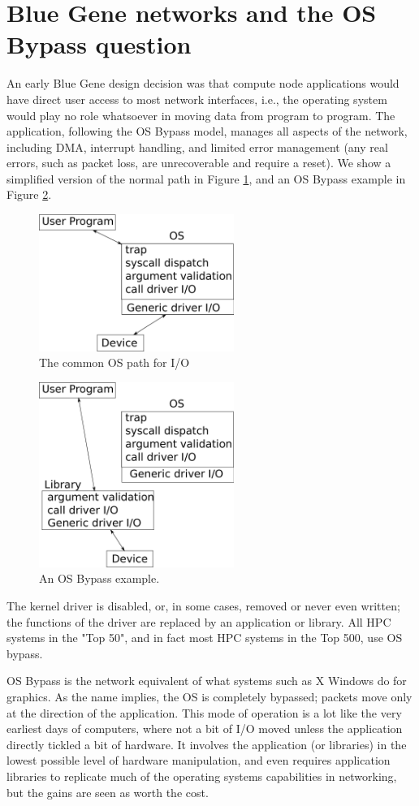 \documentclass[a4,10pt,preprint]{sigplanconf}
\begin{document}
\section{Blue Gene networks and the OS Bypass question}
An early Blue Gene design decision was that  compute node applications would have direct user access to most network interfaces, i.e., the operating system would play no role whatsoever in moving data from program to program. The application, following the OS Bypass model, manages all aspects of the network, including DMA, interrupt handling, and limited error management (any real errors, such as packet loss, are unrecoverable and require a reset). 
We show a simplified version of the normal path in Figure \ref{ospath}, and an OS Bypass example in Figure \ref{osbypass}.
\begin{figure}
\includegraphics[width=2.5in]{ospath}
\caption{\label{ospath}The common OS path for I/O}
\end{figure}
\begin{figure}
\includegraphics[width=2.5in]{osbypass}
\caption{\label{osbypass}An OS Bypass example.}
\end{figure}
The kernel driver is disabled, or, in some cases, removed or never even written; the functions of the driver are replaced by 
an application or library. 
All HPC systems in the "Top 50",
and in fact most HPC systems in the Top 500, use OS bypass. 

OS Bypass is the network equivalent of what systems such as X Windows do for graphics. 
As the name implies, the OS is completely bypassed; packets move only at the 
direction of the application. This mode of operation is a lot like the very earliest
days of computers, where not a bit of I/O moved unless the application
directly tickled a bit of hardware. It involves the application (or libraries) in the
lowest possible level of hardware manipulation, and even requires
application libraries to replicate much of the operating systems
capabilities in networking, but the gains are seen as worth the cost.
\end{document}
